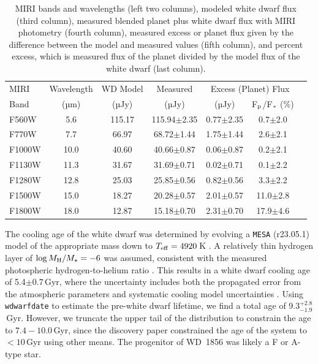\documentclass[twocolumn]{aastex631}
\begin{document}
\begin{table}
\centering
\caption{ MIRI bands and wavelengths (left two columns), modeled white dwarf flux (third column), measured blended planet plus white dwarf flux with MIRI photometry (fourth column), measured excess or planet flux given by the difference between the model and measured values (fifth column), and percent excess, which is measured flux of the planet divided by the model flux of the white dwarf (last column).}
\begin{tabular}{lcccc|cc}
\hline
{MIRI} & Wavelength & {WD Model} & {Measured} & \multicolumn{2}{c}{Excess (Planet) Flux} \\
Band & (µm) & (µJy) & (µJy) & (µJy) & F$_{\rm p}$/F$_{\rm *}$ (\%) \\
\hline
F560W   & 5.6 & 115.17 & 115.94$\pm$2.35 & 0.77$\pm$2.35 & 0.7$\pm$2.0 \\
F770W   & 7.7 & 66.97 & 68.72$\pm$1.44 & 1.75$\pm$1.44 & 2.6$\pm$2.1 \\
F1000W  & 10.0 & 40.60 & 40.66$\pm$0.87 & 0.06$\pm$0.87 & 0.2$\pm$2.1 \\
F1130W  & 11.3 & 31.67 & 31.69$\pm$0.71 & 0.02$\pm$0.71 & 0.1$\pm$2.2 \\
F1280W  & 12.8 & 25.03 & 25.85$\pm$0.56 & 0.82$\pm$0.56 & 3.3$\pm$2.2 \\
F1500W  & 15.0 & 18.27 & 20.28$\pm$0.57 & 2.01$\pm$0.57 & 11.0$\pm$2.8 \\
F1800W  & 18.0 & 12.87 & 15.18$\pm$0.70 & 2.31$\pm$0.70 & 17.9$\pm$4.6 \\
\hline
\end{tabular}
\label{photometry}
\end{table}

The cooling age of the white dwarf was determined by evolving a \texttt{MESA} (r23.05.1) model of the appropriate mass down to $T_{\rm eff}=4920\,$K \citep{2023ApJ...950..115B}. A relatively thin hydrogen layer of $\log M_{\rm H}/M_{\star}=-6$ was assumed, consistent with the measured photospheric hydrogen-to-helium ratio \citep{2018ApJ...857...56R}. This results in a white dwarf cooling age of 5.4$\pm$0.7\,Gyr, where the uncertainty includes both the propagated error from the atmospheric parameters and systematic cooling model uncertainties \citep{2024arXiv241014014P}. Using \texttt{wdwarfdate} \citep{2022AJ....164...62K} to estimate the pre-white dwarf lifetime, we find a total age of 9.3$^{+2.8}_{-1.9}$\,Gyr. However, we truncate the upper tail of the distribution to constrain the age to $7.4-10.0$\,Gyr, since the discovery paper \citep{Vanderburg_2020} constrained the age of the system to $<10$\,Gyr using other means. The progenitor of WD~1856 was likely a F or A-type star. 
\end{document}
